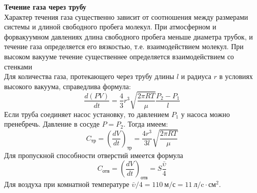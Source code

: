 \documentclass[a4paper, 12pt]{article}
\begin{document}
\textbf{Течение газа через трубу}\\
Характер течения газа существенно зависит от соотношения между размерами системы и длиной свободного пробега молекул. При атмосферном и форвакуумном давлениях  длина свободного пробега меньше диаметра трубок, и течение газа определяется его вязкостью, т.е. взаимодействием молекул. При высоком вакууме течение существеннее определяется взаимодействием со стенками \\
Для количества газа, протекающего через трубу длины $l$ и радиуса $r$ в условиях высокого вакуума, справедлива формула:
\begin{equation}
	\frac{d(PV)}{dt} = \frac{4}{3}r^3\sqrt{\frac{2\pi RT}{\mu}}\frac{P_2 - P_1}{l}
\end{equation}
Если труба соединяет насос установку, то давлением $P_1$ у насоса можно пренебречь. Давление в сосуде $P = P_2$. Тогда имеем:
\begin{equation}
C_\text{тр} = \left(\frac{dV}{dt}\right)_\text{тр} = \frac{4r^3}{3l}\sqrt{\frac{2\pi RT}{\mu}}
\end{equation}
Для пропускной способности отверстий имеется формула
\begin{equation}
C_\text{отв} = \left(\frac{dV}{dt}\right)_\text{отв} = S\frac{\bar{\upsilon}}{4}
\end{equation}
Для воздуха при комнатной температуре $\bar{\upsilon}/4 = 110~\text{м/с} = 11~\text{л/c}\cdot\text{см}^2$.
\end{document}
